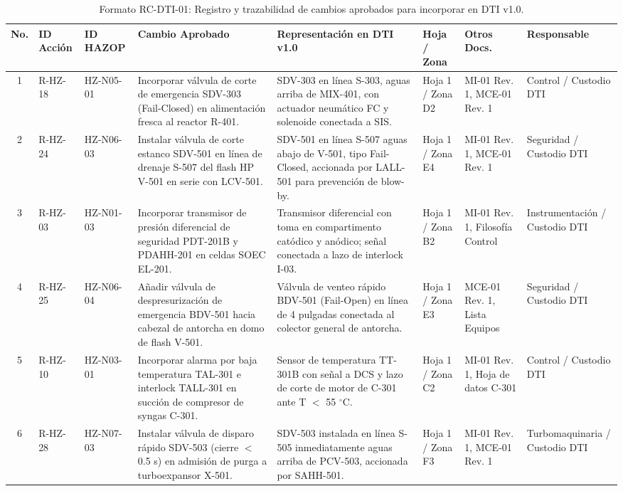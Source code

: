 \documentclass[10pt,letterpaper]{article}
\begin{document}
\begin{table}[H]
\centering\footnotesize
\caption{Formato RC-DTI-01: Registro y trazabilidad de cambios aprobados para incorporar en DTI v1.0.} \label{tab:rcdti_tabla}
\begin{tabularx}{\textwidth}{|c|l|l|X|X|p{1.8cm}|p{2.2cm}|p{2.0cm}|}
\hline
\rowcolor{tableheader}\color{white}\textbf{No.} & \color{white}\textbf{ID Acción} & \color{white}\textbf{ID HAZOP} & \color{white}\textbf{Cambio Aprobado} & \color{white}\textbf{Representación en DTI v1.0} & \color{white}\textbf{Hoja / Zona} & \color{white}\textbf{Otros Docs.} & \color{white}\textbf{Responsable} \\ \hline
1 & R-HZ-18 & HZ-N05-01 & Incorporar válvula de corte de emergencia SDV-303 (Fail-Closed) en alimentación fresca al reactor R-401. & SDV-303 en línea S-303, aguas arriba de MIX-401, con actuador neumático FC y solenoide conectada a SIS. & Hoja 1 / Zona D2 & MI-01 Rev. 1, MCE-01 Rev. 1 & Control / Custodio DTI \\ \hline
2 & R-HZ-24 & HZ-N06-03 & Instalar válvula de corte estanco SDV-501 en línea de drenaje S-507 del flash HP V-501 en serie con LCV-501. & SDV-501 en línea S-507 aguas abajo de V-501, tipo Fail-Closed, accionada por LALL-501 para prevención de blow-by. & Hoja 1 / Zona E4 & MI-01 Rev. 1, MCE-01 Rev. 1 & Seguridad / Custodio DTI \\ \hline
3 & R-HZ-03 & HZ-N01-03 & Incorporar transmisor de presión diferencial de seguridad PDT-201B y PDAHH-201 en celdas SOEC EL-201. & Transmisor diferencial con toma en compartimento catódico y anódico; señal conectada a lazo de interlock I-03. & Hoja 1 / Zona B2 & MI-01 Rev. 1, Filosofía Control & Instrumentación / Custodio DTI \\ \hline
4 & R-HZ-25 & HZ-N06-04 & Añadir válvula de despresurización de emergencia BDV-501 hacia cabezal de antorcha en domo de flash V-501. & Válvula de venteo rápido BDV-501 (Fail-Open) en línea de 4 pulgadas conectada al colector general de antorcha. & Hoja 1 / Zona E3 & MCE-01 Rev. 1, Lista Equipos & Seguridad / Custodio DTI \\ \hline
5 & R-HZ-10 & HZ-N03-01 & Incorporar alarma por baja temperatura TAL-301 e interlock TALL-301 en succión de compresor de syngas C-301. & Sensor de temperatura TT-301B con señal a DCS y lazo de corte de motor de C-301 ante T $<$ 55 $^\circ$C. & Hoja 1 / Zona C2 & MI-01 Rev. 1, Hoja de datos C-301 & Control / Custodio DTI \\ \hline
6 & R-HZ-28 & HZ-N07-03 & Instalar válvula de disparo rápido SDV-503 (cierre $<$ 0.5 s) en admisión de purga a turboexpansor X-501. & SDV-503 instalada en línea S-505 inmediatamente aguas arriba de PCV-503, accionada por SAHH-501. & Hoja 1 / Zona F3 & MI-01 Rev. 1, MCE-01 Rev. 1 & Turbomaquinaria / Custodio DTI \\ \hline

\end{tabularx}
\end{table}
\end{document}
